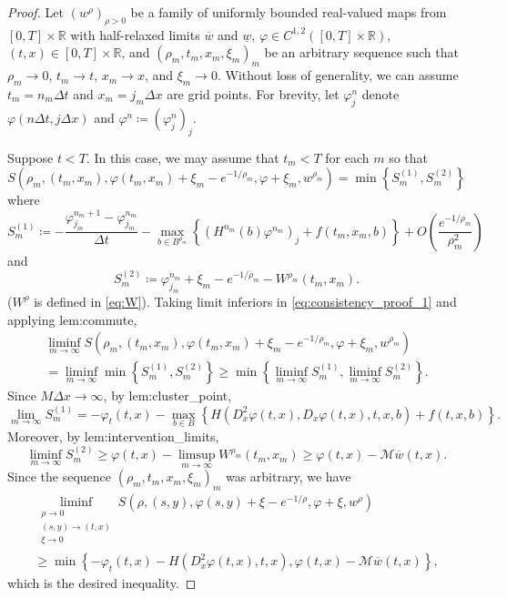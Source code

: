 \documentclass[12pt]{article}
\begin{document}
\begin{proof}
Let $(w^{\rho})_{\rho>0}$ be a family of uniformly bounded real-valued
maps from $[0,T]\times\mathbb{R}$ with half-relaxed limits $\overline{w}$
and $\underline{w}$, $\varphi\in C^{1,2}([0,T]\times\mathbb{R})$,
$(t,x)\in[0,T]\times\mathbb{R}$, and $(\rho_{m},t_{m},x_{m},\xi_{m})_{m}$
be an arbitrary sequence such that $\rho_{m}\rightarrow0$, $t_{m}\rightarrow t$,
$x_{m}\rightarrow x$, and $\xi_{m}\rightarrow0$. Without loss of
generality, we can assume $t_{m}=n_{m}\Delta t$ and $x_{m}=j_{m}\Delta x$
are grid points. For brevity, let $\varphi_{j}^{n}$ denote $\varphi(n\Delta t,j\Delta x)$
and $\varphi^{n}\coloneqq(\varphi_{j}^{n})_{j}$.

Suppose $t<T$. In this case, we may assume that $t_{m}<T$ for each
$m$ so that
\begin{equation}
S(\rho_{m},(t_{m},x_{m}),\varphi(t_{m},x_{m})+\xi_{m}-e^{-1/\rho_{m}},\varphi+\xi_{m},w^{\rho_{m}})=\min\left\{ S_{m}^{(1)},S_{m}^{(2)}\right\} \label{eq:consistency_proof_1}
\end{equation}
where
\[
S_{m}^{(1)}\coloneqq-\frac{\varphi_{j_{m}}^{n_{m}+1}-\varphi_{j_{m}}^{n_{m}}}{\Delta t}-\max_{b\in B^{\rho_{m}}}\left\{ (H^{n_{m}}(b)\varphi^{n_{m}})_{j}+f(t_{m},x_{m},b)\right\} +O\left(\frac{e^{-1/\rho_{m}}}{\rho_{m}^{2}}\right)
\]
and
\[
S_{m}^{(2)}\coloneqq\varphi_{j_{m}}^{n_{m}}+\xi_{m}-e^{-1/\rho_{m}}-W^{\rho_{m}}(t_{m},x_{m}).
\]
($W^{\rho}$ is defined in \eqref{eq:W}). Taking limit inferiors
in \eqref{eq:consistency_proof_1} and applying {\prettyref}{lem:commute},
\begin{multline*}
\liminf_{m\rightarrow\infty}S(\rho_{m},(t_{m},x_{m}),\varphi(t_{m},x_{m})+\xi_{m}-e^{-1/\rho_{m}},\varphi+\xi_{m},w^{\rho_{m}})\\=\liminf_{m\rightarrow\infty}\min\left\{ S_{m}^{(1)},S_{m}^{(2)}\right\}
{\geqslant}\min\left\{ \liminf_{m\rightarrow\infty}S_{m}^{(1)},\liminf_{m\rightarrow\infty}S_{m}^{(2)}\right\} .
\end{multline*}
Since $M\Delta x\rightarrow\infty$, by {\prettyref}{lem:cluster_point},
\[
\lim_{m\rightarrow\infty}S_{m}^{(1)}=-\varphi_{t}(t,x)-\max_{b\in B}\left\{ H(D_{x}^{2}\varphi(t,x),D_{x}\varphi(t,x),t,x,b)+f(t,x,b)\right\} .
\]
Moreover, by {\prettyref}{lem:intervention_limits},
\[
\liminf_{m\rightarrow\infty}S_{m}^{(2)}{\geqslant}\varphi(t,x)-\limsup_{m\rightarrow\infty}W^{\rho_{m}}(t_{m},x_{m}){\geqslant}\varphi(t,x)-\mathcal{M}\overline{w}(t,x).
\]
Since the sequence $(\rho_{m},t_{m},x_{m},\xi_{m})_{m}$ was arbitrary,
we have
\begin{multline*}
\liminf_{\substack{\rho\rightarrow0\\
(s,y)\rightarrow(t,x)\\
\xi\rightarrow0
}
}S(\rho,(s,y),\varphi(s,y)+\xi-e^{-1/\rho},\varphi+\xi,w^{\rho})\\
{\geqslant}\min\left\{ -\varphi_{t}(t,x)-H(D_{x}^{2}\varphi(t,x),t,x),\varphi(t,x)-\mathcal{M}\overline{w}(t,x)\right\} ,
\end{multline*}
which is the desired inequality.


\end{proof}
\end{document}
